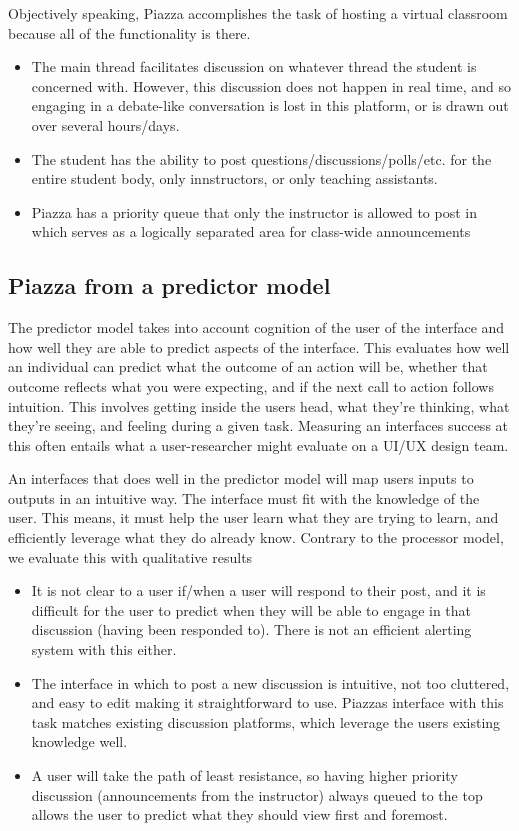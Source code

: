 \clearpage

Objectively speaking, Piazza accomplishes the task of hosting a virtual classroom because all of the functionality is there.

\begin{itemize}
\item
  The main thread facilitates discussion on whatever thread the student is concerned with. However, this discussion does not happen in real time, and so engaging in a debate-like conversation is lost in this platform, or is drawn out over several hours/days.
\item
  The student has the ability to post questions/discussions/polls/etc. for the entire student body, only innstructors, or only teaching assistants.
\item
  Piazza has a priority queue that only the instructor is allowed to post in which serves as a logically separated area for class-wide announcements
\end{itemize}

\subsection{Piazza from a predictor model}

The predictor model takes into account cognition of the user of the interface and how well they are able to predict aspects of the interface. This evaluates how well an individual can predict what the outcome of an action will be, whether that outcome reflects what you were expecting, and if the next call to action follows intuition. This involves getting inside the users head, what they're thinking, what they're seeing, and feeling during a given task. Measuring an interfaces success at this often entails what a user-researcher might evaluate on a UI/UX design team.

An interfaces that does well in the predictor model will map users inputs to outputs in an intuitive way. The interface must fit with the knowledge of the user. This means, it must help the user learn what they are trying to learn, and efficiently leverage what they do already know. Contrary to the processor model, we evaluate this with qualitative results

\begin{itemize}
\item
  It is not clear to a user if/when a user will respond to their post, and it is difficult for the user to predict when they will be able to engage in that discussion (having been responded to). There is not an efficient alerting system with this either.
\item
  The interface in which to post a new discussion is intuitive, not too cluttered, and easy to edit making it straightforward to use. Piazzas interface with this task matches existing discussion platforms, which leverage the users existing knowledge well.
\item
  A user will take the path of least resistance, so having higher priority discussion (announcements from the instructor) always queued to the top allows the user to predict what they should view first and foremost.
\end{itemize}

